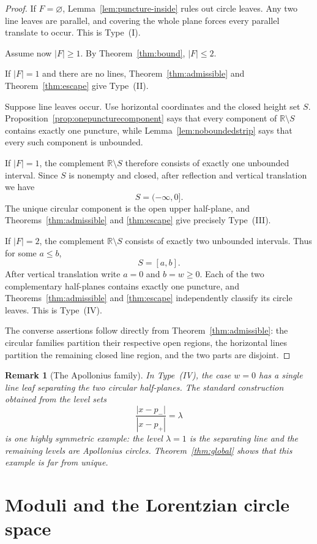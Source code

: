 \documentclass[11pt]{article}
\newtheorem{remark}[theorem]{Remark}
\newcommand{\R}{\mathbb{R}}
\begin{document}
\begin{proof}
If $F=\varnothing$, Lemma~\ref{lem:puncture-inside} rules out circle leaves. Any two line leaves are parallel, and covering the whole plane forces every parallel translate to occur. This is Type~(I).

Assume now $|F|\ge1$. By Theorem~\ref{thm:bound}, $|F|\le2$.

If $|F|=1$ and there are no lines, Theorem~\ref{thm:admissible} and Theorem~\ref{thm:escape} give Type~(II).

Suppose line leaves occur. Use horizontal coordinates and the closed height set $S$. Proposition~\ref{prop:onepuncturecomponent} says that every component of $\R\setminus S$ contains exactly one puncture, while Lemma~\ref{lem:noboundedstrip} says that every such component is unbounded.

If $|F|=1$, the complement $\R\setminus S$ therefore consists of exactly one unbounded interval. Since $S$ is nonempty and closed, after reflection and vertical translation we have
\[
S=(-\infty,0].
\]
The unique circular component is the open upper half-plane, and Theorems~\ref{thm:admissible} and \ref{thm:escape} give precisely Type~(III).

If $|F|=2$, the complement $\R\setminus S$ consists of exactly two unbounded intervals. Thus for some $a\le b$,
\[
S=[a,b].
\]
After vertical translation write $a=0$ and $b=w\ge0$. Each of the two complementary half-planes contains exactly one puncture, and Theorems~\ref{thm:admissible} and \ref{thm:escape} independently classify its circle leaves. This is Type~(IV).

The converse assertions follow directly from Theorem~\ref{thm:admissible}: the circular families partition their respective open regions, the horizontal lines partition the remaining closed line region, and the two parts are disjoint.
\end{proof}

\begin{remark}[The Apollonius family]\label{rem:apollonius}
In Type~(IV), the case $w=0$ has a single line leaf separating the two circular half-planes. The standard construction obtained from the level sets
\[
\frac{|x-p_-|}{|x-p_+|}=\lambda
\]
is one highly symmetric example: the level $\lambda=1$ is the separating line and the remaining levels are Apollonius circles. Theorem~\ref{thm:global} shows that this example is far from unique.
\end{remark}

\section{Moduli and the Lorentzian circle space}
\end{document}
